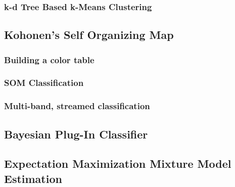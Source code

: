 \subsubsection{k-d Tree Based k-Means Clustering}
\label{sec:KdTreeBasedKMeansClustering}
\ifitkFullVersion

\fi

\subsection{Kohonen's Self Organizing Map}
\label{sec:SOM}

\subsubsection{Building a color table}
\label{sec:SOMColorTable}

\subsubsection{SOM Classification}
\label{sec:SOMClassification}


\subsubsection{Multi-band, streamed classification}

\ifitkFullVersion

\fi



\subsection{Bayesian Plug-In Classifier}
\label{sec:BayesianPluginClassifier}

\ifitkFullVersion 

\fi


\subsection{Expectation Maximization Mixture Model Estimation}
\label{sec:ExpectationMaximizationMixtureModelEstimation}

\ifitkFullVersion 

\fi




